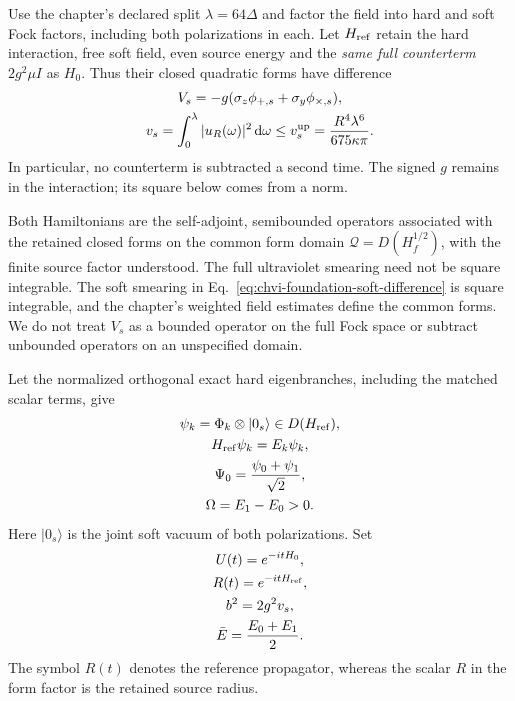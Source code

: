 Use the chapter's declared split $\lambda=64\Delta$ and factor the field
into hard and soft Fock factors, including both polarizations in each.
Let $H_{\rm ref}$ retain the hard interaction, free soft field, even source
energy and the \emph{same full counterterm} $2g^2\mu I$ as $H_0$.
Thus their closed quadratic forms have difference
\begin{equation}
\begin{gathered}
V_s=-g(\sigma_z\phi_{+,s}+\sigma_y\phi_{\times,s}),
 \\
 v_s=\int_0^\lambda |u_R(\omega)|^2\,\mathrm d\omega
 \leq v_s^{\rm up}
 =\frac{R^4\lambda^6}{675\kappa\pi}.
\end{gathered}
\label{eq:chvi-foundation-soft-difference}
\end{equation}
In particular, no counterterm is subtracted a second time. The signed $g$
remains in the interaction; its square below comes from a norm.

Both Hamiltonians are the self-adjoint, semibounded operators associated
with the retained closed forms on the common form domain
$\mathcal Q=D(H_f^{1/2})$, with the finite source factor understood.
The full ultraviolet smearing need not be square integrable. The soft
smearing in Eq.~\eqref{eq:chvi-foundation-soft-difference} is square
integrable, and the chapter's weighted field estimates define the common
forms. We do not treat $V_s$ as a bounded operator on the full Fock space
or subtract unbounded operators on an unspecified domain.

Let the normalized orthogonal exact hard eigenbranches, including the
matched scalar terms, give
\begin{equation}
\begin{gathered}
\psi_k=\Phi_k\otimes|0_s\rangle\in D(H_{\rm ref}),\\
 H_{\rm ref}\psi_k=E_k\psi_k,\\
 \Psi_0=\frac{\psi_0+\psi_1}{\sqrt2},\\
 \Omega=E_1-E_0>0.
\end{gathered}
\label{eq:chvi-foundation-preparation}
\end{equation}
Here $|0_s\rangle$ is the joint soft vacuum of both polarizations.
Set
\begin{equation}
\begin{gathered}
U(t)=e^{-itH_0},\\
 R(t)=e^{-itH_{\rm ref}},\\
 b^2=2g^2v_s,\\
 \bar E=\frac{E_0+E_1}{2}.
\end{gathered}
\label{eq:chvi-foundation-notation}
\end{equation}
The symbol $R(t)$ denotes the reference propagator, whereas the scalar
$R$ in the form factor is the retained source radius.

